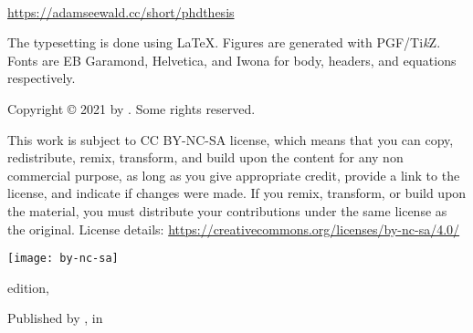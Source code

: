 
%
%
%
{\small\setlength{\parindent}{0em}\setlength{\parskip}{1em}
~

\vfill


\url{https://adamseewald.cc/short/phdthesis}

The typesetting is done using \LaTeX. Figures are generated with PGF/Ti\textit{k}Z. Fonts are EB Garamond, Helvetica, and Iwona for body, headers, and equations respectively.


Copyright \copyright{} 2021 by \authorname. Some rights reserved.

This work is subject to CC BY-NC-SA license, which means that you can copy, redistribute, remix, transform, and build upon the content for any non commercial purpose, as long as you give appropriate credit, provide a link to the license, and indicate if changes were made. If you remix, transform, or build upon the material, you must distribute your contributions under the same license as the original. License details: \url{https://creativecommons.org/licenses/by-nc-sa/4.0/}

\texttt{[image: by-nc-sa]}

\edition{} edition, \editionyear{}


Published by \publisher{}, in \place{}
}\cleardoublepage
